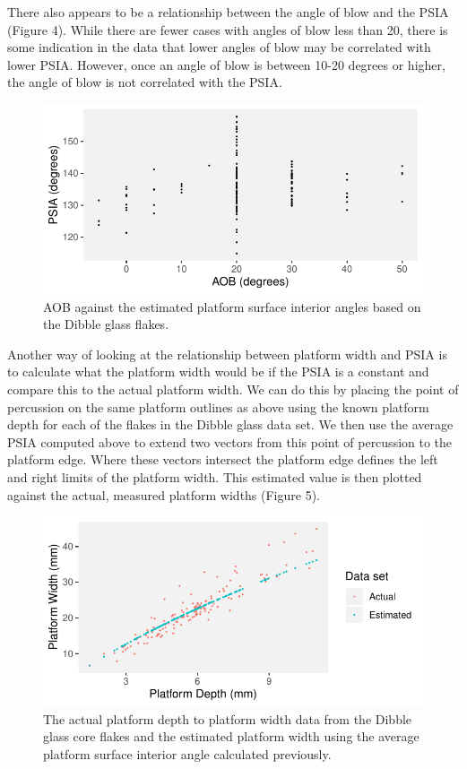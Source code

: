\documentclass[10pt,letterpaper]{article}
\begin{document}
There also appears to be a relationship between the angle of blow and
the PSIA (Figure 4). While there are fewer cases with angles of blow
less than 20, there is some indication in the data that lower angles of
blow may be correlated with lower PSIA. However, once an angle of blow
is between 10-20 degrees or higher, the angle of blow is not correlated
with the PSIA.

\begin{figure}
\centering
\includegraphics{PSIA_Manuscript_files/figure-latex/fig4-AOB_to_PSIA-1.pdf}
\caption{AOB against the estimated platform surface interior angles
based on the Dibble glass flakes.}
\end{figure}

Another way of looking at the relationship between platform width and
PSIA is to calculate what the platform width would be if the PSIA is a
constant and compare this to the actual platform width. We can do this
by placing the point of percussion on the same platform outlines as
above using the known platform depth for each of the flakes in the
Dibble glass data set. We then use the average PSIA computed above to
extend two vectors from this point of percussion to the platform edge.
Where these vectors intersect the platform edge defines the left and
right limits of the platform width. This estimated value is then plotted
against the actual, measured platform widths (Figure 5).

\begin{figure}
\centering
\includegraphics{PSIA_Manuscript_files/figure-latex/fig5-pd_pw_with_estimated_pw-1.pdf}
\caption{The actual platform depth to platform width data from the
Dibble glass core flakes and the estimated platform width using the
average platform surface interior angle calculated previously.}
\end{figure}
\end{document}
